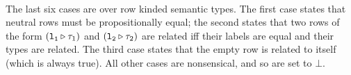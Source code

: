\documentclass[authoryear, acmsmall, screen, review, nonacm]{acmart}
\begin{document}
\begin{code}
\AgdaSpace{}%
\AgdaSymbol{\}}\AgdaSpace{}%
\<%
\\
%
\>[2]\AgdaSpace{}%
\AgdaSpace{}%
\AgdaSpace{}%
\AgdaSpace{}%
\AgdaSpace{}%
\AgdaSpace{}%
\AgdaSpace{}%
\AgdaSpace{}%
\AgdaSpace{}%
\AgdaSpace{}%
\<%
\\
%
\\[\AgdaEmptyExtraSkip]%
\>[0]\AgdaSpace{}%
\AgdaSymbol{\{}\AgdaSpace{}%
\AgdaSymbol{=}\AgdaSpace{}%
\AgdaSymbol{\}}\AgdaSpace{}%
\AgdaSpace{}%
\AgdaSpace{}%
\AgdaSymbol{=}\AgdaSpace{}%
\AgdaSpace{}%
\AgdaSpace{}%
\<%
\\
\>[0]\AgdaSpace{}%
\AgdaSymbol{\{}\AgdaSpace{}%
\AgdaSymbol{=}\AgdaSpace{}%
\AgdaSymbol{\}}\AgdaSpace{}%
\AgdaSpace{}%
\AgdaSpace{}%
\AgdaSymbol{=}\AgdaSpace{}%
\AgdaSpace{}%
\AgdaSpace{}%
\<%
\\
\>[0]\AgdaSpace{}%
\AgdaSymbol{\{}\AgdaSymbol{\}}\AgdaSpace{}%
\AgdaSymbol{\{}\AgdaSpace{}%
\AgdaSymbol{=}\AgdaSpace{}%
\AgdaSpace{}%
\AgdaSpace{}%
\AgdaSymbol{\}}\AgdaSpace{}%
\AgdaSpace{}%
\AgdaSpace{}%
\AgdaSymbol{=}\<%
\\
\>[0][@{}l@{\AgdaIndent{0}}]%
\>[2]\AgdaSpace{}%
\AgdaSpace{}%
\AgdaSpace{}%
\AgdaSpace{}%
\AgdaSpace{}%
\AgdaSpace{}%
\AgdaSpace{}%
\AgdaSymbol{\{}\AgdaSymbol{\}}\AgdaSpace{}%
\AgdaSpace{}%
\<%
\end{code}

The last six cases are over row kinded semantic types. The first case states that neutral rows must be propositionally equal; the second states that two rows of the form $(\mathtt{l_1} \triangleright \tau_1)$ and $(\mathtt{l_2} \triangleright \tau_2)$ are related iff their labels are equal and their types are related. The third case states that the empty row is related to itself (which is always true). All other cases are nonsensical, and so are set to $\bot$.
\end{document}
